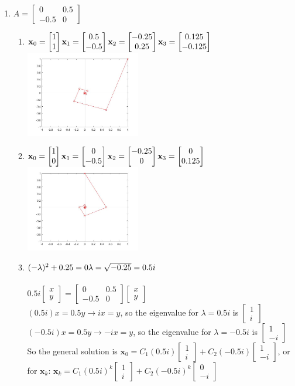 \documentclass{article}
\newcommand{\newVec}[2]{\begin{bmatrix}#1 \\ #2 \end{bmatrix}}
\newcommand{\newtt}[4]{\begin{bmatrix}#1 & #2\\ #3 & #4 \end{bmatrix}}
\begin{document}
\begin{enumerate}
\begin{enumerate}
\end{enumerate}
\item 
$A = \newtt{0}{0.5}{-0.5}{0}$
\begin{enumerate}
    \item $\textbf{x}_0 = \newVec{1}{1}\\ \textbf{x}_1 = \newVec{0.5}{-0.5}\\ \textbf{x}_2 = \newVec{-0.25}{0.25}\\ \textbf{x}_3 = \newVec{0.125}{-0.125}$\\
        \includegraphics[width=50mm,scale=1]{Matlab1_1.jpg}
    \item $\textbf{x}_0 = \newVec{1}{0}\\ \textbf{x}_1 = \newVec{0}{-0.5}\\ \textbf{x}_2 = \newVec{-0.25}{0}\\ \textbf{x}_3 = \newVec{0}{0.125}$\\
        \includegraphics[width=50mm,scale=1]{Matlab1_2.jpg}
    \item $(-\lambda)^2 + 0.25 = 0\\
            \lambda = \sqrt{-0.25} = 0.5i$\\\\
            $0.5i\newVec{x}{y} = \newtt{0}{0.5}{-0.5}{0}\newVec{x}{y}$\\
            $(0.5i)x = 0.5y \rightarrow ix = y$, so the eigenvalue for $\lambda = 0.5i$ is $\newVec{1}{i}$\\
             $(-0.5i)x = 0.5y \rightarrow -ix = y$, so the eigenvalue for $\lambda = -0.5i$ is $\newVec{1}{-i}$\\
             So the general solution is $\textbf{x}_0 = C_1 (0.5i)\newVec{1}{i} + C_2 (-0.5i)\newVec{1}{-i}$, or for $\textbf{x}_k$: $\textbf{x}_k = C_1 (0.5i)^k\newVec{1}{i} + C_2 (-0.5i)^k\newVec{0}{-i}$\\

\end{enumerate}
\end{enumerate}
\end{document}
